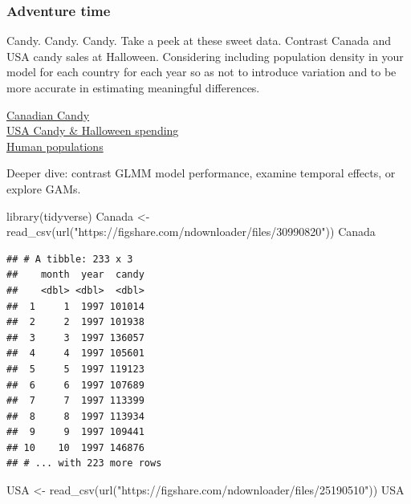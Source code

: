 \documentclass[
]{book}
\newenvironment{Shaded}{\begin{snugshade}}{\end{snugshade}}
\newcommand{\FunctionTok}[1]{\textcolor[rgb]{0.00,0.00,0.00}{#1}}
\newcommand{\NormalTok}[1]{#1}
\newcommand{\OtherTok}[1]{\textcolor[rgb]{0.56,0.35,0.01}{#1}}
\newcommand{\StringTok}[1]{\textcolor[rgb]{0.31,0.60,0.02}{#1}}
\begin{document}
\hypertarget{adventure-time-4}{%
\subsubsection*{Adventure time}\label{adventure-time-4}}

Candy. Candy. Candy. Take a peek at these sweet data. Contrast Canada and USA candy sales at Halloween. Considering including population density in your model for each country for each year so as not to introduce variation and to be more accurate in estimating meaningful differences.

\href{https://figshare.com/articles/dataset/Canadian_Candy_Sales/9876386}{Canadian Candy}\\
\href{https://figshare.com/articles/dataset/USA_Halloween_spending/13125572}{USA Candy \& Halloween spending}\\
\href{https://figshare.com/articles/dataset/World_human_populations/16746652}{Human populations}

Deeper dive: contrast GLMM model performance, examine temporal effects, or explore GAMs.

\begin{Shaded}
\begin{Highlighting}[]
\FunctionTok{library}\NormalTok{(tidyverse)}
\NormalTok{Canada }\OtherTok{\textless{}{-}} \FunctionTok{read\_csv}\NormalTok{(}\FunctionTok{url}\NormalTok{(}\StringTok{"https://figshare.com/ndownloader/files/30990820"}\NormalTok{))}
\NormalTok{Canada}
\end{Highlighting}
\end{Shaded}

\begin{verbatim}
## # A tibble: 233 x 3
##    month  year  candy
##    <dbl> <dbl>  <dbl>
##  1     1  1997 101014
##  2     2  1997 101938
##  3     3  1997 136057
##  4     4  1997 105601
##  5     5  1997 119123
##  6     6  1997 107689
##  7     7  1997 113399
##  8     8  1997 113934
##  9     9  1997 109441
## 10    10  1997 146876
## # ... with 223 more rows
\end{verbatim}

\begin{Shaded}
\begin{Highlighting}[]
\NormalTok{USA }\OtherTok{\textless{}{-}} \FunctionTok{read\_csv}\NormalTok{(}\FunctionTok{url}\NormalTok{(}\StringTok{"https://figshare.com/ndownloader/files/25190510"}\NormalTok{))}
\NormalTok{USA}
\end{Highlighting}
\end{Shaded}
\end{document}
